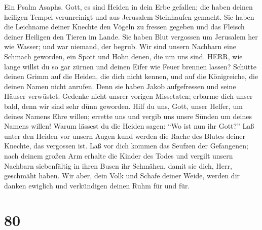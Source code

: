  Ein Psalm Asaphs. Gott, es sind Heiden in dein Erbe
gefallen; die haben deinen heiligen Tempel verunreinigt und aus
Jerusalem Steinhaufen gemacht.  Sie haben die Leichname
deiner Knechte den Vögeln zu fressen gegeben und das Fleisch deiner
Heiligen den Tieren im Lande.  Sie haben Blut vergossen um
Jerusalem her wie Wasser; und war niemand, der begrub.  Wir
sind unsern Nachbarn eine Schmach geworden, ein Spott und Hohn denen,
die um uns sind.  HERR, wie lange willst du so gar zürnen
und deinen Eifer wie Feuer brennen lassen?  Schütte deinen
Grimm auf die Heiden, die dich nicht kennen, und auf die Königreiche,
die deinen Namen nicht anrufen.  Denn sie haben Jakob
aufgefressen und seine Häuser verwüstet.  Gedenke nicht
unsrer vorigen Missetaten; erbarme dich unser bald, denn wir sind sehr
dünn geworden.  Hilf du uns, Gott, unser Helfer, um deines
Namens Ehre willen; errette uns und vergib uns unsre Sünden um deines
Namens willen!  Warum lässest du die Heiden sagen: ``Wo ist
nun ihr Gott?'' Laß unter den Heiden vor unsern Augen kund werden die
Rache des Blutes deiner Knechte, das vergossen ist.  Laß
vor dich kommen das Seufzen der Gefangenen; nach deinem großen Arm
erhalte die Kinder des Todes  und vergilt unsern Nachbarn
siebenfältig in ihren Busen ihr Schmähen, damit sie dich, Herr,
geschmäht haben.  Wir aber, dein Volk und Schafe deiner
Weide, werden dir danken ewiglich und verkündigen deinen Ruhm für und
für.

\hypertarget{section-79}{%
\section{80}\label{section-79}}

